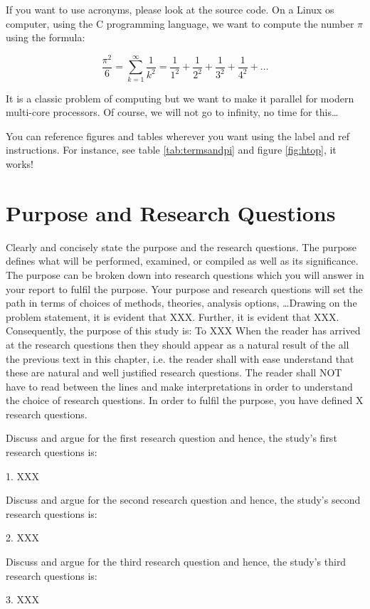 \documentclass[a4paper, 12pt]{report}
\begin{document}
\medskip
If you want to use acronyms, please look at the source code. On a Linux \acrfull{os} computer, using the C programming language, we want to compute the number $\pi$ using the formula:

$$
\frac{\pi^2}{6} = \sum_{k=1}^{\infty} \frac{1}{k^2} = \frac{1}{1^2} + \frac{1}{2^2} + \frac{1}{3^2} + \frac{1}{4^2} + \dots
$$

It is a classic problem of computing but we want to make it parallel for modern multi-core processors. Of course, we will not go to infinity, no time for this\dots

You can reference figures and tables wherever you want using the label and ref instructions. For instance, see table \ref{tab:termsandpi} and figure \ref{fig:htop}, it works!

\section{Purpose and Research Questions}

{\color{jupurple}
Clearly and concisely state the purpose and the research questions. The purpose defines what will be performed, examined, or compiled as well as its significance. The purpose can be broken down into research questions which you will answer in your report to fulfil the purpose. Your purpose and research questions will set the path in terms of choices of methods, theories, analysis options, \dots Drawing on the problem statement, it is evident that XXX. Further, it is evident that XXX. Consequently, the purpose of this study is: 
To XXX
When the reader has arrived at the research questions then they should appear as a natural result of the all the previous text in this chapter, i.e. the reader shall with ease understand that these are natural and well justified research questions. The reader shall NOT have to read between the lines and make interpretations in order to understand the choice of research questions.
In order to fulfil the purpose, you have defined X research questions.

Discuss and argue for the first research question and hence, the study's first research questions is:

1. XXX

Discuss and argue for the second research question and hence, the study's second research questions is: 

2. XXX

Discuss and argue for the third research question and hence, the study's third research questions is:

3. XXX
}
\end{document}
